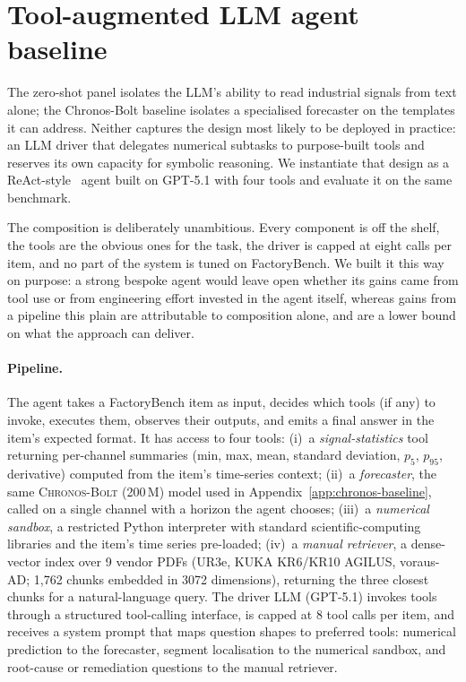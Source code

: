 \section{Tool-augmented LLM agent baseline}
\label{app:agent-baseline}

The zero-shot panel isolates the LLM's ability to read industrial signals from text alone; the Chronos-Bolt baseline isolates a specialised forecaster on the templates it can address. Neither captures the design most likely to be deployed in practice: an LLM driver that delegates numerical subtasks to purpose-built tools and reserves its own capacity for symbolic reasoning. We instantiate that design as a ReAct-style~\cite{yao2023react} agent built on GPT-5.1 with four tools and evaluate it on the same benchmark.

The composition is deliberately unambitious. Every component is off the shelf, the tools are the obvious ones for the task, the driver is capped at eight calls per item, and no part of the system is tuned on FactoryBench. We built it this way on purpose: a strong bespoke agent would leave open whether its gains came from tool use or from engineering effort invested in the agent itself, whereas gains from a pipeline this plain are attributable to composition alone, and are a lower bound on what the approach can deliver.

\paragraph{Pipeline.} The agent takes a FactoryBench item as input, decides which tools (if any) to invoke, executes them, observes their outputs, and emits a final answer in the item's expected format. It has access to four tools:
(i)~a \emph{signal-statistics} tool returning per-channel summaries (min, max, mean, standard deviation, $p_5$, $p_{95}$, derivative) computed from the item's time-series context;
(ii)~a \emph{forecaster}, the same \textsc{Chronos-Bolt} (200\,M) model used in Appendix~\ref{app:chronos-baseline}, called on a single channel with a horizon the agent chooses;
(iii)~a \emph{numerical sandbox}, a restricted Python interpreter with standard scientific-computing libraries and the item's time series pre-loaded;
(iv)~a \emph{manual retriever}, a dense-vector index over 9 vendor PDFs (UR3e, KUKA KR6/KR10 AGILUS, voraus-AD; 1{,}762 chunks embedded in 3072 dimensions), returning the three closest chunks for a natural-language query.
The driver LLM (GPT-5.1) invokes tools through a structured tool-calling interface, is capped at 8 tool calls per item, and receives a system prompt that maps question shapes to preferred tools: numerical prediction to the forecaster, segment localisation to the numerical sandbox, and root-cause or remediation questions to the manual retriever.


